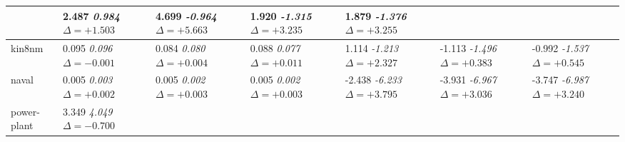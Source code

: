 \begin{otherlanguage}{ngerman}
\begin{table*}[!htbp]
\begin{tabularx}{\textwidth}{|l|X|X|X|X|X|X|}
& 2.487 \newline \textit{0.984} \newline \mbox{$\Delta=+1.503$} 
& 4.699 \newline \textit{-0.964} \newline \mbox{$\Delta=+5.663$} 
& 1.920 \newline \textit{-1.315} \newline \mbox{$\Delta=+3.235$} 
& 1.879 \newline \textit{-1.376} \newline \mbox{$\Delta=+3.255$} \\ \hline
kin8nm 
& 0.095 \newline \textit{0.096} \newline \mbox{$\Delta=-0.001$} 
& 0.084 \newline \textit{0.080} \newline \mbox{$\Delta=+0.004$} 
& 0.088 \newline \textit{0.077} \newline \mbox{$\Delta=+0.011$} 
& 1.114 \newline \textit{-1.213} \newline \mbox{$\Delta=+2.327$} 
& -1.113 \newline \textit{-1.496} \newline \mbox{$\Delta=+0.383$} 
& -0.992 \newline \textit{-1.537} \newline \mbox{$\Delta=+0.545$} \\ \hline
naval 
& 0.005 \newline \textit{0.003} \newline \mbox{$\Delta=+0.002$} 
& 0.005 \newline \textit{0.002} \newline \mbox{$\Delta=+0.003$} 
& 0.005 \newline \textit{0.002} \newline \mbox{$\Delta=+0.003$} 
& -2.438 \newline \textit{-6.233} \newline \mbox{$\Delta=+3.795$} 
& -3.931 \newline \textit{-6.967} \newline \mbox{$\Delta=+3.036$} 
& -3.747 \newline \textit{-6.987} \newline \mbox{$\Delta=+3.240$} \\ \hline
power-plant 
& 3.349 \newline \textit{4.049} \newline \mbox{$\Delta=-0.700$} 

\end{tabularx}
\end{table*}
\end{otherlanguage}
